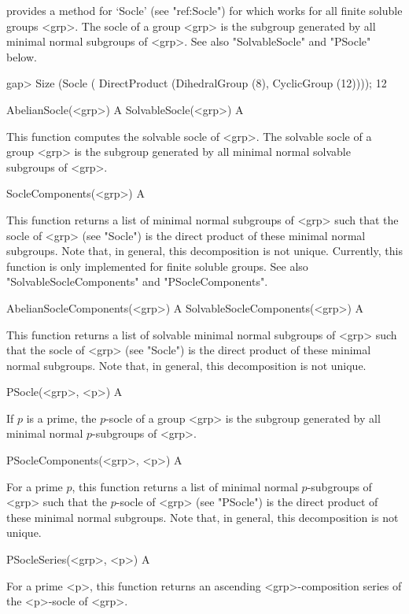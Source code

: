 {\CRISP} provides a method for `Socle' (see "ref:Socle") for which works for 
all finite soluble groups <grp>. The socle of a group <grp> is the subgroup 
generated by all minimal normal subgroups of <grp>. See also "SolvableSocle" and 
"PSocle" below.

\beginexample
gap> Size (Socle ( DirectProduct (DihedralGroup (8), CyclicGroup (12))));
12
\endexample

\>AbelianSocle(<grp>) A
\>SolvableSocle(<grp>) A

This function computes the solvable socle of <grp>. The solvable socle of a group <grp> is the
subgroup  generated by all minimal normal solvable subgroups of <grp>.

\>SocleComponents(<grp>) A

This function returns a list of minimal normal subgroups of <grp> such 
that the socle of <grp> (see "Socle") is the direct product of these minimal normal
subgroups. Note that, in general, this decomposition is not unique. Currently,
this function is only implemented for finite soluble groups. See also 
"SolvableSocleComponents" and  "PSocleComponents".

\>AbelianSocleComponents(<grp>) A
\>SolvableSocleComponents(<grp>) A

This function returns a list of solvable minimal normal subgroups of <grp> such 
that the socle of <grp> (see "Socle") is the direct product of these minimal normal
subgroups. Note that, in general, this decomposition is not unique.

\>PSocle(<grp>, <p>) A

If $p$ is a prime, the $p$-socle of a group <grp> is the subgroup 
generated by all minimal normal $p$-subgroups of <grp>.

\>PSocleComponents(<grp>, <p>) A

For a prime $p$, this function returns a list of minimal normal $p$-subgroups of <grp>
such  that the $p$-socle of <grp> (see "PSocle") is the direct product of these minimal normal
subgroups. Note that, in general, this decomposition is not unique.

\>PSocleSeries(<grp>, <p>) A

For a prime <p>, this function returns an ascending <grp>-composition series of the <p>-socle of <grp>.




